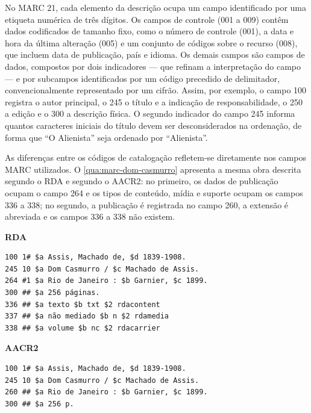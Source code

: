 No MARC 21, cada elemento da descrição ocupa um campo identificado por uma etiqueta numérica de três dígitos. Os campos de controle (001 a 009) contêm dados codificados de tamanho fixo, como o número de controle (001), a data e hora da última alteração (005) e um conjunto de códigos sobre o recurso (008), que incluem data de publicação, país e idioma. Os demais campos são campos de dados, compostos por dois indicadores --- que refinam a interpretação do campo --- e por subcampos identificados por um código precedido de delimitador, convencionalmente representado por um cifrão. Assim, por exemplo, o campo 100 registra o autor principal, o 245 o título e a indicação de responsabilidade, o 250 a edição e o 300 a descrição física. O segundo indicador do campo 245 informa quantos caracteres iniciais do título devem ser desconsiderados na ordenação, de forma que ``O Alienista'' seja ordenado por ``Alienista''.

As diferenças entre os códigos de catalogação refletem-se diretamente nos campos MARC utilizados. O \autoref{qua:marc-dom-casmurro} apresenta a mesma obra descrita segundo o RDA e segundo o AACR2: no primeiro, os dados de publicação ocupam o campo 264 e os tipos de conteúdo, mídia e suporte ocupam os campos 336 a 338; no segundo, a publicação é registrada no campo 260, a extensão é abreviada e os campos 336 a 338 não existem.

\begin{quadro}[htb]
    \caption{Registro de \textit{Dom Casmurro} em MARC 21 segundo o RDA e o AACR2 (simplificado)}
    \label{qua:marc-dom-casmurro}
    \footnotesize
    \textbf{RDA}
\begin{verbatim}
100 1# $a Assis, Machado de, $d 1839-1908.
245 10 $a Dom Casmurro / $c Machado de Assis.
264 #1 $a Rio de Janeiro : $b Garnier, $c 1899.
300 ## $a 256 páginas.
336 ## $a texto $b txt $2 rdacontent
337 ## $a não mediado $b n $2 rdamedia
338 ## $a volume $b nc $2 rdacarrier
\end{verbatim}
    \textbf{AACR2}
\begin{verbatim}
100 1# $a Assis, Machado de, $d 1839-1908.
245 10 $a Dom Casmurro / $c Machado de Assis.
260 ## $a Rio de Janeiro : $b Garnier, $c 1899.
300 ## $a 256 p.
\end{verbatim}
\end{quadro}

